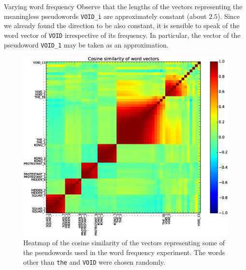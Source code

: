 \documentclass{article} %
\newcommand{\word}[1]{\texttt{#1}}
\begin{document}
\begin{section}{Varying word frequency}
Observe that the lengths of the vectors representing the meaningless pseudowords
\word{VOID\_i} are approximately constant (about $2.5$).  Since we
already found the direction to be also constant, it is sensible to speak
of the word vector of \word{VOID} irrespective of its frequency.  In
particular, the vector of the pseudoword \word{VOID\_1} may be taken as an approximation.

\begin{figure}
	\includegraphics[scale=0.5]{word-frequency-experiment-heatmap}
	\caption{ Heatmap of the cosine similarity of the vectors
          representing some of the pseudowords used in the word frequency
          experiment.  The words other than \word{the} and \word{VOID}
          were chosen randomly.  }
	\label{word-frequency-experiment-heatmap}
\end{figure}


\end{section}
\end{document}
